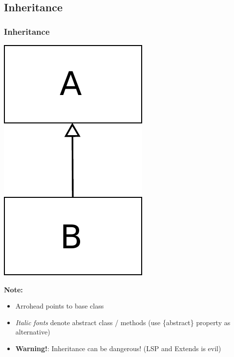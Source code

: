 \documentclass{beamer}
\begin{document}
\subsection{Inheritance}
\begin{frame}
	\frametitle{Inheritance}
	\begin{center}
		\includegraphics[scale=0.4]{inheritance}
	\end{center}
	\textbf{Note:}
	\begin{itemize}
  			\item Arrohead points to base class
  			\item \textit{Italic fonts} denote abstract class / methods (use \{abstract\} property as alternative)
  			\item \textbf{Warning!}: Inheritance can be dangerous! (LSP and Extends is evil)
	\end{itemize}
\end{frame}
\end{document}
